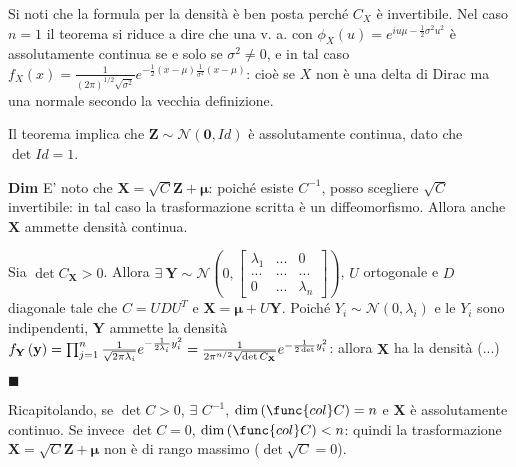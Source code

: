 \documentclass{article}
\begin{document}
Si noti che la formula per la densit\`{a} \`{e} ben posta perch\'{e} $C_{X}$ 
\`{e} invertibile. Nel caso $n=1$ il teorema si riduce a dire che una v. a.
con $\phi _{X}\left( u\right) =e^{iu\mu -\frac{1}{2}\sigma ^{2}u^{2}}$ \`{e}
assolutamente continua se e solo se $\sigma ^{2}\neq 0$, e in tal caso $%
f_{X}\left( x\right) =\frac{1}{\left( 2\pi \right) ^{1/2}\sqrt{\sigma ^{2}}}%
e^{-\frac{1}{2}\left( x-\mu \right) \frac{1}{\sigma ^{2}}\left( x-\mu
\right) }$: cio\`{e} se $X$ non \`{e} una delta di Dirac ma una normale
secondo la vecchia definizione.

Il teorema implica che $\mathbf{Z}\sim \mathcal{N}\left( \mathbf{0}%
,Id\right) $ \`{e} assolutamente continua, dato che $\det Id=1$.

\textbf{Dim} E' noto che $\mathbf{X}=\sqrt{C}\mathbf{Z+\mu }$: poich\'{e}
esiste $C^{-1}$, posso scegliere $\sqrt{C}$ invertibile: in tal caso la
trasformazione scritta \`{e} un diffeomorfismo. Allora anche $\mathbf{X}$
ammette densit\`{a} continua.

Sia $\det C_{\mathbf{X}}>0$. Allora $\exists \ \mathbf{Y}\sim \mathcal{N}%
\left( 0,\left[ 
\begin{array}{ccc}
\lambda _{1} & ... & 0 \\ 
... & ... & ... \\ 
0 & ... & \lambda _{n}%
\end{array}%
\right] \right) $, $U$ ortogonale e $D$ diagonale tale che $C=UDU^{T}$ e $%
\mathbf{X=\mu }+U\mathbf{Y}$. Poich\'{e} $Y_{i}\sim \mathcal{N}\left(
0,\lambda _{i}\right) $ e le $Y_{i}$ sono indipendenti, $\mathbf{Y}$ ammette
la densit\`{a} $f_{\mathbf{Y}}\left( \mathbf{y}\right) =\prod_{j=1}^{n}\frac{%
1}{\sqrt{2\pi \lambda _{i}}}e^{-\frac{1}{2\lambda _{i}}y_{i}^{2}}=\frac{1}{%
2\pi ^{n/2}\sqrt{\det C_{\mathbf{X}}}}e^{-\frac{1}{2\det }y_{i}^{2}}$:
allora $\mathbf{X}$ ha la densit\`{a} (...)

$\blacksquare $


Ricapitolando, se $\det C>0$, $\exists $ $C^{-1}$, $\dim \left( \func{col}%
C\right) =n$ e $\mathbf{X}$ \`{e} assolutamente continuo. Se invece $\det
C=0 $, $\dim \left( \func{col}C\right) <n$: quindi la trasformazione $%
\mathbf{X}=\sqrt{C}\mathbf{Z+\mu }$ non \`{e} di rango massimo ($\det \sqrt{C%
}=0$).
\end{document}
